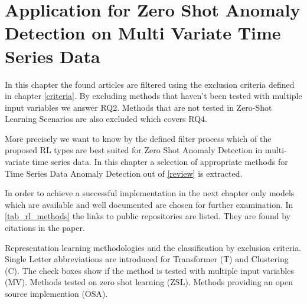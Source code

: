 \section{Application for Zero Shot Anomaly Detection on Multi Variate Time Series Data}\label{application}
In this chapter the found articles are filtered using the exclusion criteria defined in chapter \ref{criteria}. By excluding methods that haven't been tested with multiple input variables we answer RQ2. Methods that are not tested in Zero-Shot Learning Scenarios are also excluded which covers RQ4.

More precisely we want to know by the defined filter process which of the proposed RL types are best suited for Zero Shot Anomaly Detection in multi-variate time series data. In this chapter a selection of appropriate methods for Time Series Data Anomaly Detection out of \ref{review} is extracted. 

 In order to achieve a successful implementation in the next chapter only models which are available and well documented are chosen for further examination. In \ref{tab_rl_methods} the links to public repositories are listed. They are found by citations in the paper.
 \begin{table}
   \caption{Representation learning methodologies and the classification by exclusion criteria. Single Letter abbreviations are introduced for Transformer (T) and Clustering (C). The check boxes show if the method is tested with multiple input variables (MV). Methods tested on zero shot learning (ZSL). Methods providing an open source implemention (OSA).}\label{tab_rl_methods}
   
 \end{table}